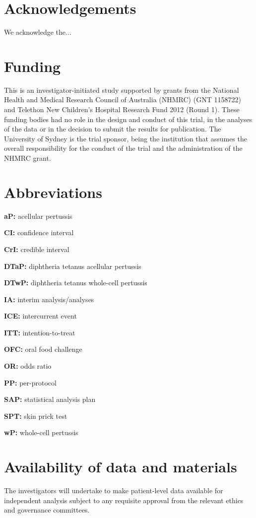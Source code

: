 \documentclass{bmcart}
\begin{document}
\begin{backmatter}

\section*{Acknowledgements}%
We acknowledge the...

\section*{Funding}%
This is an investigator-initiated study supported by grants from the National Health and Medical Research Council of Australia (NHMRC) (GNT 1158722) and Telethon New Children's Hospital Research Fund 2012 (Round 1).
These funding bodies had no role in the design and conduct of this trial, in the analyses of the data or in the decision to submit the results for publication.
The University of Sydney is the trial sponsor, being the institution that assumes the overall responsibility for the conduct of the trial and the administration of the NHMRC grant.

\section*{Abbreviations}%
\textbf{aP:} acellular pertussis

\textbf{CI:} confidence interval

\textbf{CrI:} credible interval

\textbf{DTaP:} diphtheria tetanus acellular pertussis 

\textbf{DTwP:} diphtheria tetanus whole-cell pertussis 

\textbf{IA:} interim analysis/analyses

\textbf{ICE:} intercurrent event

\textbf{ITT:} intention-to-treat

\textbf{OFC:} oral food challenge

\textbf{OR:} odds ratio

\textbf{PP:} per-protocol

\textbf{SAP:} statistical analysis plan

\textbf{SPT:} skin prick test

\textbf{wP:} whole-cell pertussis

\section*{Availability of data and materials}%
The investigators will undertake to make patient-level data available for independent analysis subject to any requisite approval from the relevant ethics and governance committees.


\end{backmatter}
\end{document}
